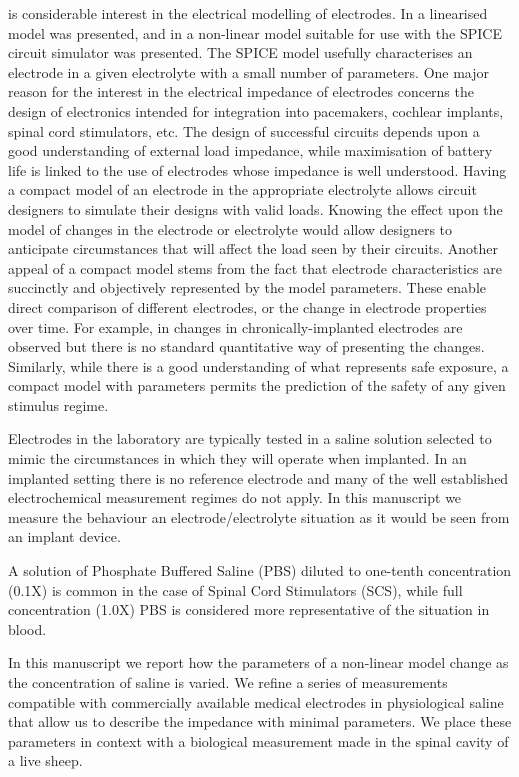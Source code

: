 \documentclass[journal, a4paper]{IEEEtran}
\begin{document}
 is considerable interest in the electrical modelling of electrodes. \cite{Cogan2008,Troy2006}
In \cite{Franks2005} a linearised model was presented, and in \cite{ScottSingle2013} a non-linear model
suitable for use with the SPICE circuit simulator was presented. The SPICE model usefully characterises an electrode in a given electrolyte with a small number of parameters.
One major reason for the interest in the electrical impedance of electrodes concerns the design of electronics intended for integration into pacemakers, cochlear implants, spinal cord stimulators, etc. The design of successful circuits depends upon a good understanding of external load impedance, while maximisation of battery life is linked to the use of electrodes whose impedance is well understood.
Having a compact model of an electrode in the appropriate electrolyte allows circuit designers to simulate their designs with valid loads. Knowing the effect upon the model of changes in the electrode or electrolyte would allow designers to anticipate circumstances that will affect the load seen by their circuits. Another appeal of a compact model stems from the fact that electrode characteristics are succinctly and objectively represented by the model parameters. These enable direct comparison of different electrodes, or the change in electrode properties over time. For example, in \cite{Kane13} changes in chronically-implanted electrodes are observed but there is no standard quantitative way of presenting the changes. Similarly, while there is a good understanding of what represents safe exposure, a compact model with parameters permits the prediction of the safety of any given stimulus regime.~\cite{Merrill05}

Electrodes in the laboratory are typically tested in a saline solution selected to mimic the circumstances in which they will operate when implanted.
In an implanted setting there is no reference electrode and many of the well established electrochemical measurement regimes do not apply. In this manuscript we measure the behaviour an electrode/electrolyte situation as it would be seen from an implant device.

A solution of Phosphate Buffered Saline (PBS) diluted to one-tenth concentration (0.1X) is common in the case of Spinal Cord Stimulators (SCS), while full concentration (1.0X) PBS is considered more representative of the situation in blood.

In this manuscript we report how the parameters of a non-linear model change as the concentration of saline is varied. We refine a series of measurements compatible with commercially available medical electrodes in physiological saline that allow us to describe the impedance with minimal parameters. We place these parameters in context with a biological measurement made in the spinal cavity of a live sheep.
\end{document}
